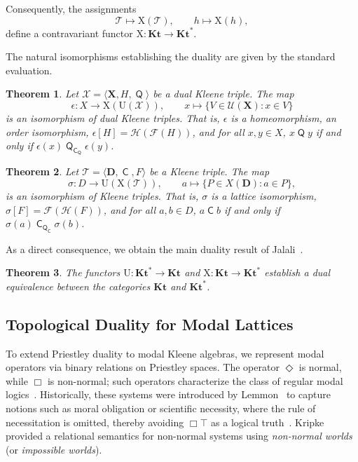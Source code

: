 \documentclass[10pt,a4paper]{amsart}
\newtheorem{theorem}{Theorem}[section]
\DeclareMathOperator{\con}{\mathsf{C}}
\DeclareMathOperator{\Q}{\mathsf{Q}}
\newcommand{\D}{\mathbf{D}}
\newcommand{\X}{\mathbf{X}}
\newcommand{\T}{\mathcal{T}}
\newcommand{\U}{\mathcal{U}}
\begin{document}
Consequently, the assignments
\[
\T \longmapsto \mathrm{X}(\T), \qquad h \longmapsto \mathrm{X}(h),
\]
define a contravariant functor $\mathrm{X} \colon \mathbf{Kt} \longrightarrow \mathbf{Kt}^{*}$.

The natural isomorphisms establishing the duality are given by the standard evaluation.

\begin{theorem}
\label{thm:epsilon-iso}
Let $\mathcal{X} = \langle \X, H, \Q \rangle$ be a dual Kleene triple. The map
\[
\epsilon \colon X \longrightarrow \mathrm{X}(\mathrm{U}(\mathcal{X})), \qquad x \mapsto \{V \in \U(\X) : x \in V\}
\]
is an isomorphism of dual Kleene triples. That is, $\epsilon$ is a homeomorphism, an order isomorphism, $\epsilon[H] = \mathcal{H}(\mathcal{F}(H))$, and for all $x,y \in X$, $ x\Q y$ if and only if $\epsilon(x) \Q_{\con_{\Q}}\epsilon(y)$.
\end{theorem}

\begin{theorem}
\label{thm:sigma-iso}
Let $\T = \langle \D, \con, F \rangle$ be a Kleene triple. The map
\[\sigma \colon D \longrightarrow \mathrm{U}(\mathrm{X}(\T)), \qquad a \mapsto \{P \in X(\D) : a \in P\},\]
is an isomorphism of Kleene triples. That is, $\sigma$ is a lattice isomorphism, $\sigma[F] = \mathcal{F}(\mathcal{H}(F))$, and for all $a,b \in D$, $a \con b$ if and only if $\sigma(a) \con_{\Q_{\con}} \sigma(b)$.
\end{theorem}

As a direct consequence, we obtain the main duality result of Jalali~\cite{jalali}.

\begin{theorem}
\label{thm:Kt-duality}
The functors $\mathrm{U} \colon \mathbf{Kt}^{*} \to \mathbf{Kt}$ and $\mathrm{X} \colon \mathbf{Kt} \to \mathbf{Kt}^{*}$ establish a dual equivalence between the categories $\mathbf{Kt}$ and $\mathbf{Kt}^{*}$.
\end{theorem}

\subsection{Topological Duality for Modal Lattices}
\label{subsec:topological-duality-modal-lattices}

To extend Priestley duality to modal Kleene algebras, we represent modal operators via binary relations on Priestley spaces. The operator $\Diamond$ is normal, while $\Box$ is non-normal; such operators characterize the class of regular modal logics~\cite[p.~234]{Chellas1980}. Historically, these systems were introduced by Lemmon~\cite{Lemmon1957} to capture notions such as moral obligation or scientific necessity, where the rule of necessitation is omitted, thereby avoiding $\Box \top$ as a logical truth~\cite{Lemmon1957, palmigiano2016}. Kripke~\cite{Kripke1965} provided a relational semantics for non-normal systems using \emph{non-normal worlds} (or \emph{impossible worlds}).
\end{document}
